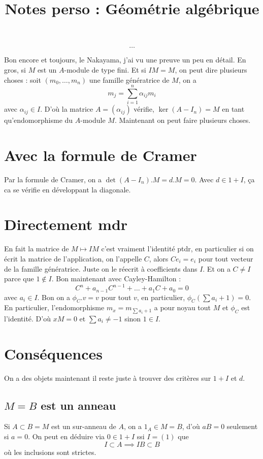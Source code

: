\documentclass[a4paper,12pt]{book}
\title{Notes perso : Géométrie algébrique}
\date{}
\theoremstyle{plain}
\theoremstyle{definition}
\theoremstyle{remark}
\begin{document}
\maketitle
\tableofcontents
\[\ldots\]   

Bon encore et toujours, le Nakayama, j'ai vu une preuve un peu en détail.
En gros, si $M$ est un $A$-module de type fini. Et si $IM=M$, on peut 
dire plusieurs choses : soit $(m_0,\ldots, m_n)$ une famille génératrice
de $M$, on a 
\[m_j = \sum_{i=1}^n \alpha_{ij}m_i\]
avec $\alpha_{ij}\in I$. D'où la matrice $A=(\alpha_{ij})$ vérifie,
$\ker(A-I_n)=M$ en tant qu'endomorphisme du $A$-module $M$. Maintenant
on peut faire plusieurs choses.

\section{Avec la formule de Cramer}
Par la formule de Cramer, on a $\det(A-I_n).M=d.M=0$. Avec $d\in 1+I$, 
ça ca se vérifie en développant la diagonale. 

\section{Directement mdr}
En fait la matrice de $M\mapsto IM$ c'est vraiment l'identité ptdr,
en particulier si on écrit la matrice de l'application, on l'appelle
$C$, alors $Ce_i=e_i$ pour tout vecteur de la famille génératrice. 
Juste on le réecrit à coefficients dans $I$. Et on a $C\ne I$ parce que
$1\notin I$. Bon maintenant avec Cayley-Hamilton :
\[C^n+a_{n-1}C^{n-1}+\ldots+a_1C+a_0=0\]
avec $a_i\in I$. Bon on a $\phi_C.v=v$ pour tout $v$, en particulier,
$\phi_C(\sum a_i + 1)=0$. En particulier, l'endomorphisme 
$m_x=m_{\sum a_i +1}$ a pour noyau tout $M$ et $\phi_C$ est l'identité.
D'où $xM=0$ et $\sum a_i \ne -1$ sinon $1\in I$.

\section{Conséquences}
On a des objets maintenant il reste juste à trouver des critères sur
$1+I$ et $d$.

\subsection{$M=B$ est un anneau}
Si $A\subset B=M$ est un sur-anneau de $A$, on a $1_A\in M=B$,
d'où $aB=0$ seulement si $a=0$. On peut en déduire via 
$0\in1+I$ ssi $I=(1)$ que 
\[I\subset A\implies IB\subset B\]
où les inclusions sont strictes.
\end{document}
